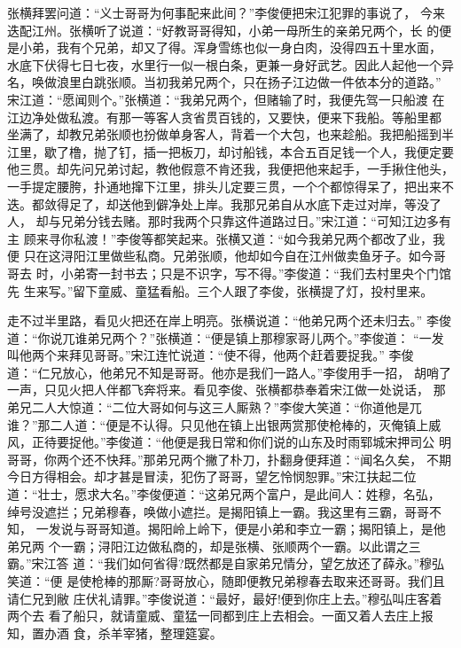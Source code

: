 张横拜罢问道：“义士哥哥为何事配来此间？”李俊便把宋江犯罪的事说了，
今来迭配江州。张横听了说道：“好教哥哥得知，小弟一母所生的亲弟兄两个，长
的便是小弟，我有个兄弟，却又了得。浑身雪练也似一身白肉，没得四五十里水面，
水底下伏得七日七夜，水里行一似一根白条，更兼一身好武艺。因此人起他一个异
名，唤做浪里白跳张顺。当初我弟兄两个，只在扬子江边做一件依本分的道路。”
宋江道：“愿闻则个。”张横道：“我弟兄两个，但赌输了时，我便先驾一只船渡
在江边净处做私渡。有那一等客人贪省贯百钱的，又要快，便来下我船。等船里都
坐满了，却教兄弟张顺也扮做单身客人，背着一个大包，也来趁船。我把船摇到半
江里，歇了橹，抛了钉，插一把板刀，却讨船钱，本合五百足钱一个人，我便定要
他三贯。却先问兄弟讨起，教他假意不肯还我，我便把他来起手，一手揪住他头，
一手提定腰胯，扑通地撺下江里，排头儿定要三贯，一个个都惊得呆了，把出来不
迭。都敛得足了，却送他到僻净处上岸。我那兄弟自从水底下走过对岸，等没了人，
却与兄弟分钱去赌。那时我两个只靠这件道路过日。”宋江道：“可知江边多有主
顾来寻你私渡！”李俊等都笑起来。张横又道：“如今我弟兄两个都改了业，我便
只在这浔阳江里做些私商。兄弟张顺，他却如今自在江州做卖鱼牙子。如今哥哥去
时，小弟寄一封书去；只是不识字，写不得。”李俊道：“我们去村里央个门馆先
生来写。”留下童威、童猛看船。三个人跟了李俊，张横提了灯，投村里来。

走不过半里路，看见火把还在岸上明亮。张横说道：“他弟兄两个还未归去。”
李俊道：“你说兀谁弟兄两个？”张横道：“便是镇上那穆家哥儿两个。”李俊道：
“一发叫他两个来拜见哥哥。”宋江连忙说道：“使不得，他两个赶着要捉我。”
李俊道：“仁兄放心，他弟兄不知是哥哥。他亦是我们一路人。”李俊用手一招，
胡哨了一声，只见火把人伴都飞奔将来。看见李俊、张横都恭奉着宋江做一处说话，
那弟兄二人大惊道：“二位大哥如何与这三人厮熟？”李俊大笑道：“你道他是兀
谁？”那二人道：“便是不认得。只见他在镇上出银两赏那使枪棒的，灭俺镇上威
风，正待要捉他。”李俊道：“他便是我日常和你们说的山东及时雨郓城宋押司公
明哥哥，你两个还不快拜。”那弟兄两个撇了朴刀，扑翻身便拜道：“闻名久矣，
不期今日方得相会。却才甚是冒渎，犯伤了哥哥，望乞怜悯恕罪。”宋江扶起二位
道：“壮士，愿求大名。”李俊便道：“这弟兄两个富户，是此间人：姓穆，名弘，
绰号没遮拦；兄弟穆春，唤做小遮拦。是揭阳镇上一霸。我这里有三霸，哥哥不知，
一发说与哥哥知道。揭阳岭上岭下，便是小弟和李立一霸；揭阳镇上，是他弟兄两
个一霸；浔阳江边做私商的，却是张横、张顺两个一霸。以此谓之三霸。”宋江答
道：“我们如何省得?既然都是自家弟兄情分，望乞放还了薛永。”穆弘笑道：“便
是使枪棒的那厮?哥哥放心，随即便教兄弟穆春去取来还哥哥。我们且请仁兄到敝
庄伏礼请罪。”李俊说道：“最好，最好!便到你庄上去。”穆弘叫庄客着两个去
看了船只，就请童威、童猛一同都到庄上去相会。一面又着人去庄上报知，置办酒
食，杀羊宰猪，整理筵宴。

